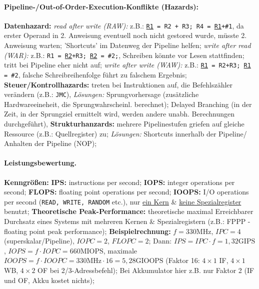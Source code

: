 \documentclass[8pt,a4paper]{article}
\begin{document}
\begin{multicols}{2}
\paragraph{Pipeline-/Out-of-Order-Execution-Konflikte (Hazards):} \textbf{Datenhazard:} \emph{read
  after write (RAW):} z.B.: \texttt{\underline{R1} = R2 + R3; R4 = \underline{R1}+\#1}, da
erster Operand in 2. Anweisung eventuell noch nicht gestored wurde,
müsste 2. Anweisung warten; 'Shortcuts' im Datenweg der Pipeline
helfen; \emph{write after read (WAR):} z.B.: \texttt{R1 = \underline{R2}+R3; \underline{R2} =
  \#2;}, Schreiben könnte vor Lesen stattfinden; tritt bei Pipeline
eher nicht auf; \emph{write after write (WAW):} z.B.:
\texttt{\underline{R1} = R2+R3; \underline{R1} = \#2}, falsche
Schreibreihenfolge führt zu falschem Ergebnis; \textbf{Steuer/Kontrollhazards:}
treten bei Instruktionen auf, die Befehlszähler verändern (z.B.: \texttt{JMC}), \emph{Lösungen:} Sprungvorhersage
(zusätzliche Hardwareeineheit, die Sprungwahrscheinl. berechnet);
Delayed Branching (in der Zeit, in der Sprungziel ermittelt wird,
werden andere unabh. Berechnungen durchgeführt),
\textbf{Strukturhanzards:} mehrere Pipelinestufen griefen auf gleiche
Ressource (z.B.: Quellregister) zu; \emph{Lösungen:} Shortcuts
innerhalb der Pipeline/ Anhalten der Pipeline (NOP);

\paragraph{Leistungsbewertung.} \textbf{Kenngrößen:} \textbf{IPS:}
instructions per second; \textbf{IOPS:} integer operations per second;
\textbf{FLOPS:} floating point operations per second; \textbf{IOOPS:}
I/O operations per second (\texttt{READ, WRITE, RANDOM} etc.), nur \underline{ein Kern} \& \underline{keine Spezialregister} benutzt; 
\textbf{Theoretische Peak-Performance:} theoretische maximal
Erreichbarer Durchsatz eines Systems mit mehreren Kernen \& Spezialregistern (z.B.: FPPP - floating point peak performance);
\textbf{Beispielrechnung:} $f=330\text{MHz}$, $IPC=4$ (superskalar/Pipeline), $IOPC=2$, $FLOPC=2$; Dann: $IPS=IPC\cdot f=1,32\text{GIPS}$, $IOPS=f\cdot IOPC=660\text{MIOPS}$, maximale $IOOPS=f\cdot IOOPC=330\text{MHz}\cdot 16=5,28\text{GIOOPS}$ (Faktor 16: $4\times 1$ IF, $4\times 1$ WB, $4\times 2$ OF bei 2/3-Adressbefehl); Bei Akkumulator hier z.B. nur Faktor 2 (IF und OF, Akku kostet nichts);



\end{multicols}
\end{document}

